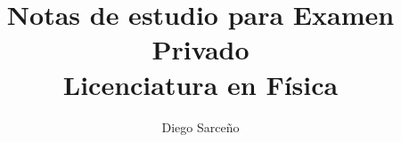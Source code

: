 \documentclass[11pt,dvipsnames]{report} %
\title{Notas de estudio para Examen Privado\\
Licenciatura en Física}
\author{Diego Sarceño}
\newcommand{\1}{\mathds{1}}
\begin{document}
\maketitle

\tableofcontents








%
%


%
%

\nocite{*}


\end{document}
